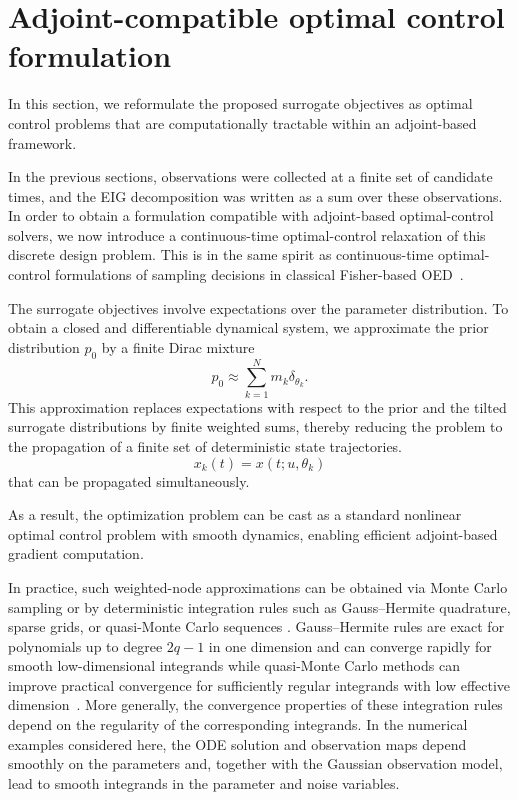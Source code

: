 \documentclass[a4paper,11pt]{article}
\begin{document}
\section{Adjoint-compatible optimal control formulation}\label{sec:optim_problem_formulation}

In this section, we reformulate the proposed surrogate objectives as optimal control problems that are computationally tractable within an adjoint-based framework.


In the previous sections, observations were collected at a finite set of
candidate times, and the EIG decomposition was written as a sum over these
observations. In order to obtain a formulation compatible with adjoint-based
optimal-control solvers, we now introduce a continuous-time optimal-control
relaxation of this discrete design problem. This is in the same spirit as
continuous-time optimal-control formulations of sampling decisions in classical
Fisher-based OED~\cite{Sager2013}.

The surrogate objectives involve expectations over the parameter
distribution. To obtain a closed and differentiable dynamical system,
we approximate the prior distribution $p_{0}$ by a finite Dirac mixture
\begin{equation} \label{eq:dirac_approx_prior}
    p_{0} \approx \sum_{k=1}^{N} m_{k} \delta_{\theta_{k}} .
\end{equation}
This approximation replaces expectations with respect to the prior and the tilted surrogate distributions by finite weighted sums, thereby reducing the problem to the propagation of a finite set of deterministic state trajectories.
\[
x_k(t) = x(t; u, \theta_k)
\]
that can be propagated simultaneously. 

As a result, the optimization problem can be cast as a standard nonlinear optimal control problem with smooth dynamics, enabling efficient adjoint-based gradient computation.

In practice, such weighted-node approximations can be obtained via Monte Carlo sampling or by
deterministic integration rules such as Gauss--Hermite quadrature, sparse grids, or
quasi-Monte Carlo sequences \cite{Zhou2024,dick2013high,bungartz2004sparse}. Gauss--Hermite rules
are exact for polynomials up to degree \(2q-1\) in one dimension and can
converge rapidly for smooth low-dimensional integrands while quasi-Monte
Carlo methods can improve practical convergence for sufficiently regular
integrands with low effective dimension~\cite{dick2013high}. More generally,
the convergence properties of these integration rules depend on the
regularity of the corresponding integrands. In the numerical examples
considered here, the ODE solution and observation maps depend smoothly on
the parameters and, together with the Gaussian observation model, lead to
smooth integrands in the parameter and noise variables.
\end{document}
